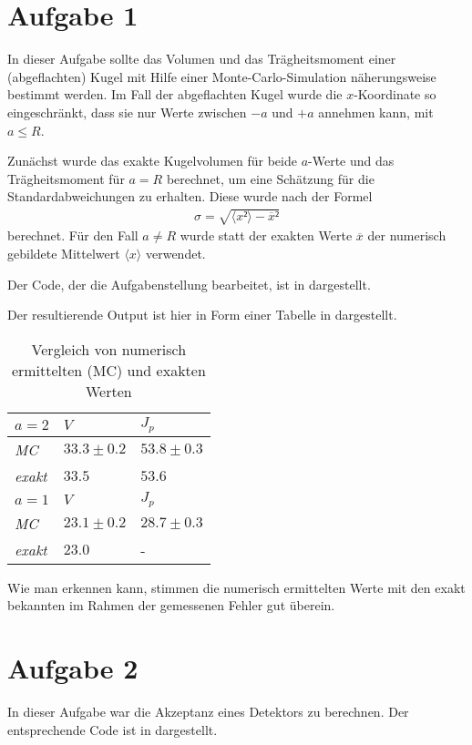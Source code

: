 \section*{Aufgabe 1}
In dieser Aufgabe sollte das Volumen und das Trägheitsmoment einer (abgeflachten)
Kugel mit Hilfe einer Monte-Carlo-Simulation näherungsweise bestimmt werden. Im Fall
der abgeflachten Kugel wurde die $x$-Koordinate so eingeschränkt, dass sie nur Werte 
zwischen $-a$ und $+a$ annehmen kann, mit $a\le R$.

Zunächst wurde das exakte Kugelvolumen für beide $a$-Werte und das Trägheitsmoment
für $a=R$ berechnet, um eine Schätzung für die Standardabweichungen zu erhalten.
Diese wurde nach der Formel
\begin{eqnarray}
σ = \sqrt{\langle x²\rangle - \overline{x}²}
\label{eqn:sigma}
\end{eqnarray}
berechnet. Für den Fall $a\ne R$ wurde statt der exakten Werte $\overline{x}$ der numerisch
gebildete Mittelwert $\langle x \rangle$ verwendet.

Der Code, der die Aufgabenstellung bearbeitet, ist in  dargestellt.



Der resultierende Output ist hier in Form einer Tabelle in  dargestellt.

\begin{table}[htbp]
\centering
\setlength{\tabcolsep}{14pt}
\begin{tabular*}{0.5\columnwidth}{lll}
\toprule
$a = 2$ & {$V$} & {$J_p$}\\
\midrule
\textit{MC} & $ 33.3\pm0.2 $ & $ 53.8\pm0.3 $ \\
\textit{exakt} & $ 33.5 $ & $ 53.6 $ \\
\midrule
$a = 1$ & {$V$} & {$J_p$}\\
\midrule
\textit{MC} & $ 23.1\pm0.2 $ & $ 28.7\pm0.3 $ \\
\textit{exakt} & $ 23.0 $ & - \\
\bottomrule
\end{tabular*}
\caption{Vergleich von numerisch ermittelten (MC) und exakten Werten}
\label{tab:erg}
\end{table}

Wie man erkennen kann, stimmen die numerisch ermittelten Werte mit den exakt bekannten
im Rahmen der gemessenen Fehler gut überein.

\section*{Aufgabe 2}
In dieser Aufgabe war die Akzeptanz eines Detektors zu berechnen. Der entsprechende
Code ist in  dargestellt.

